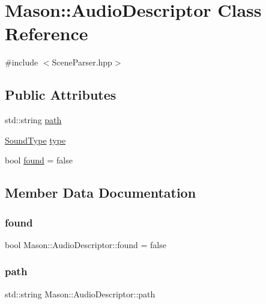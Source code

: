 \hypertarget{class_mason_1_1_audio_descriptor}{}\section{Mason\+:\+:Audio\+Descriptor Class Reference}
\label{class_mason_1_1_audio_descriptor}


{\ttfamily \#include $<$Scene\+Parser.\+hpp$>$}

\subsection*{Public Attributes}
\begin{DoxyCompactItemize}
\item 
std\+::string \hyperlink{class_mason_1_1_audio_descriptor_a48908da92ad467deffccb4d8340aea20}{path}
\item 
\hyperlink{namespace_mason_a158d651086d1ba1aacc4c37125b27657}{Sound\+Type} \hyperlink{class_mason_1_1_audio_descriptor_af0235fd20741197930246f28acb5113b}{type}
\item 
bool \hyperlink{class_mason_1_1_audio_descriptor_ab49d1cfecfbd13d161f1bad522bd3294}{found} = false
\end{DoxyCompactItemize}


\subsection{Member Data Documentation}
\hypertarget{class_mason_1_1_audio_descriptor_ab49d1cfecfbd13d161f1bad522bd3294}{}\label{class_mason_1_1_audio_descriptor_ab49d1cfecfbd13d161f1bad522bd3294} 
\subsubsection{\texorpdfstring{found}{found}}
{\footnotesize\ttfamily bool Mason\+::\+Audio\+Descriptor\+::found = false}

\hypertarget{class_mason_1_1_audio_descriptor_a48908da92ad467deffccb4d8340aea20}{}\label{class_mason_1_1_audio_descriptor_a48908da92ad467deffccb4d8340aea20} 
\subsubsection{\texorpdfstring{path}{path}}
{\footnotesize\ttfamily std\+::string Mason\+::\+Audio\+Descriptor\+::path}

